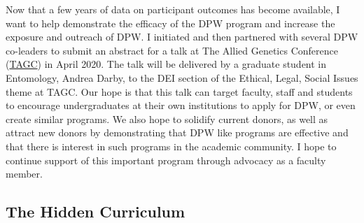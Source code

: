 \documentclass[11pt]{article}
\newcommand{\amy}[1]{{\color{amyCol} [\textbf{Amy:} #1]}}
\begin{document}
Now that a few years of data on participant outcomes has become available, I want to help demonstrate the efficacy of the DPW program and increase the exposure and outreach of DPW. I initiated and then partnered with several DPW co-leaders to submit an abstract for a talk at The Allied Genetics Conference (\href{https://genetics-gsa.org/tagc-2020/}{TAGC}) in April 2020. The talk will be delivered by a graduate student in Entomology, Andrea Darby, to the DEI section of the Ethical, Legal, Social Issues theme at TAGC. Our hope is that this talk can target faculty, staff and students to encourage undergraduates at their own institutions to apply for DPW, or even create similar programs. We also hope to solidify current donors, as well as attract new donors by demonstrating that DPW like programs are effective and that there is interest in such programs in the academic community. I hope to continue support of this important program through advocacy as a faculty member.  


\subsection*{The Hidden Curriculum}


\end{document}
